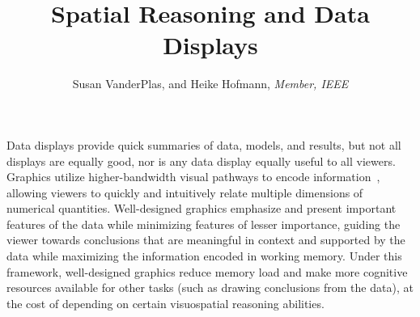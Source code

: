 \documentclass[journal]{vgtc}\usepackage[]{graphicx}\usepackage[]{color}
\title{Spatial Reasoning and Data Displays}
\author{Susan VanderPlas, and Heike Hofmann, \textit{Member, IEEE}}
\begin{document}


\maketitle



\label{sec:introduction}Data displays provide quick summaries of data, models, and results, but not all displays are equally good, nor is any data display equally useful to all viewers. 
Graphics utilize higher-bandwidth visual pathways to encode information~\cite{baddeley1974working}, allowing viewers to quickly and intuitively relate multiple dimensions of numerical quantities.
Well-designed graphics emphasize and present important features of the data while minimizing  features of lesser importance, guiding the viewer towards conclusions that are meaningful in context and supported by the data while maximizing the information encoded in working memory. Under this framework, well-designed graphics reduce memory load and make more cognitive resources available for other tasks (such as drawing conclusions from the data), at the cost of depending on certain visuospatial reasoning abilities. 
\end{document}
